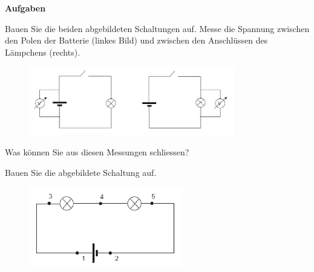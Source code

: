 \documentclass[11pt]{article}
\newenvironment{enumerate*}%
  {\begin{enumerate}%
    \setlength{\itemsep}{2pt}%
    \setlength{\parskip}{2pt}}%
  {\end{enumerate}}
\begin{document}
\vspace{0.2cm}
\textbf{Aufgaben}

\vspace{-0.2cm}

\begin{enumerate*}
    \item Bauen Sie  die beiden abgebildeten Schaltungen auf. Messe die Spannung zwischen den Polen der Batterie (linkes Bild) und zwischen den Anschlüssen des Lämpchens (rechts). 

	\vspace{0.2cm}
    \begin{figure}[h!]
    \centering
    \includegraphics[width=0.8\textwidth]{images/Spannung_A1.png}
    \label{fig:U_A1}
    \end{figure}

	\vspace{0.2cm}

	Was können Sie aus diesen Messungen schliessen? 

	\vspace{0.5cm}
	

	\newpage
    
    \item Bauen Sie die abgebildete Schaltung auf.
	
	\begin{figure}[h!]
		\centering
		\includegraphics[width=0.6\textwidth]{images/Spannung_A2.png}
		\label{fig:U_A2}
	\end{figure}
	

\end{enumerate*}
\end{document}
